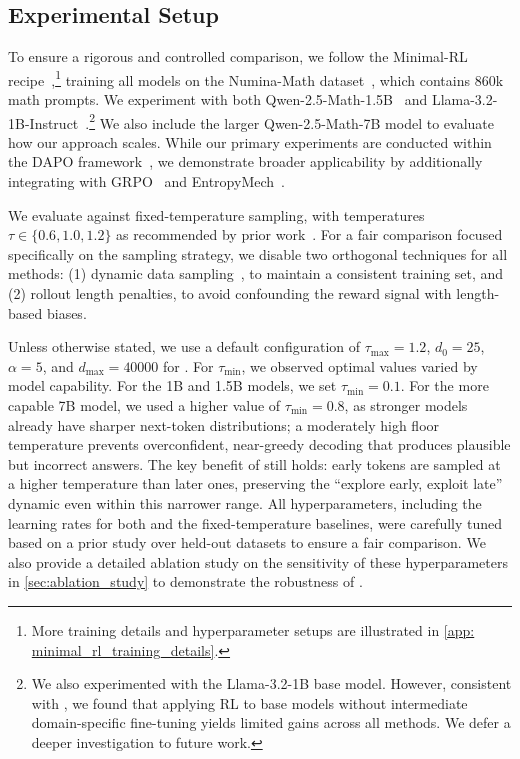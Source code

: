 \subsection{Experimental Setup}
\label{sec: experiment_setup}
To ensure a rigorous and controlled comparison, we follow the Minimal-RL recipe~\citep{xiong2025minimalist},\footnote{More training details and hyperparameter setups are illustrated in \cref{app: minimal_rl_training_details}. } training all models on the Numina-Math dataset~\citep{numina_math_7b}, which contains 860k math prompts. We experiment with both Qwen-2.5-Math-1.5B~\citep{yang2024qwen2} and Llama-3.2-1B-Instruct~\citep{dubey2024llama}.\footnote{We also experimented with the Llama-3.2-1B base model. However, consistent with \citet{wang2025octothinker}, we found that applying RL to base models without intermediate domain-specific fine-tuning yields limited gains across all methods. We defer a deeper investigation to future work.} We also include the larger Qwen-2.5-Math-7B model to evaluate how our approach scales. While our primary experiments are conducted within the DAPO framework~\citep{yu2025dapo}, we demonstrate broader applicability by additionally integrating \alg with GRPO~\citep{shao2024deepseekmath} and EntropyMech~\citep{cui2025entropy}.

We evaluate \alg against fixed-temperature sampling, with temperatures $\tau \in \{0.6, 1.0, 1.2\}$ as recommended by prior work~\citep{renze-2024-effect, guo2025deepseek, hou2025t1}. For a fair comparison focused specifically on the sampling strategy, we disable two orthogonal techniques for all methods: (1) dynamic data sampling~\citep{yu2025dapo}, to maintain a consistent training set, and (2) rollout length penalties, to avoid confounding the reward signal with length-based biases.

Unless otherwise stated, we use a default configuration of $\tau_{\max}=1.2$, $d_0=25$, $\alpha = 5$, and $d_{\max}=40000$ for \alg. 
%
For $\tau_{\min}$, we observed optimal values varied by model capability.
%
For the 1B and 1.5B models, we set $\tau_{\min}=0.1$. 
%
For the more capable 7B model, we used a higher value of $\tau_{\min}=0.8$, as stronger models already have sharper next-token distributions; a moderately high floor temperature prevents overconfident, near-greedy decoding that produces plausible but incorrect answers. The key benefit of \alg still holds: early tokens are sampled at a higher temperature than later ones, preserving the ``explore early, exploit late'' dynamic even within this narrower range.
%
All hyperparameters, including the learning rates for both \alg and the fixed-temperature baselines, were carefully tuned based on a prior study over held-out datasets to ensure a fair comparison. We also provide a detailed ablation study on the sensitivity of these hyperparameters in \cref{sec:ablation_study} to demonstrate the robustness of \alg.
%

